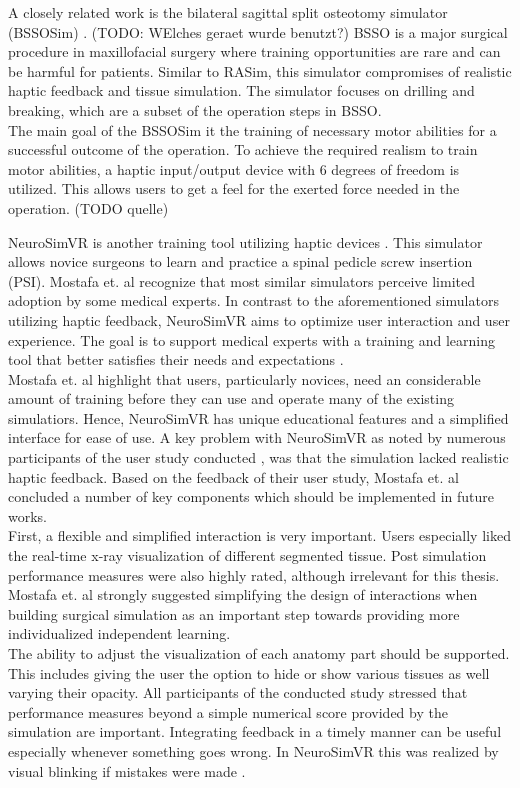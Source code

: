 A closely related work is the bilateral sagittal split osteotomy simulator (BSSOSim) \cite{RN69}.
(TODO: WElches geraet wurde benutzt?) BSSO is a major surgical procedure in maxillofacial
surgery where training opportunities are rare and can be harmful for patients. Similar
to RASim, this simulator compromises of realistic haptic feedback and tissue simulation.
The simulator focuses on drilling and breaking, which are a subset of the operation steps
in BSSO.
\\ The main goal of the BSSOSim it the training of necessary motor abilities for a successful
outcome of the operation. To achieve the required realism to train motor abilities, a haptic input/output device with 6 degrees of freedom is utilized. This allows users to
get a feel for the exerted force needed in the operation. (TODO quelle)

NeuroSimVR is another training tool utilizing haptic devices \cite{RN71}. This simulator allows
novice surgeons to learn and practice a spinal pedicle screw insertion (PSI). Mostafa
et. al recognize that most similar simulators perceive limited adoption by some medical
experts. In contrast to the aforementioned simulators utilizing haptic feedback, NeuroSimVR aims to optimize user interaction
and user experience. The goal is to support medical experts with a training and learning
tool that better satisfies their needs and expectations \cite{RN71}.
\\ Mostafa et. al highlight that users, particularly novices, need an considerable amount
of training before they can use and operate many of the existing simulatiors. Hence,
NeuroSimVR has unique educational features and a simplified interface for ease of use.
A key problem with NeuroSimVR as noted by numerous participants of the user study
conducted \cite{RN71}, was that the simulation lacked realistic haptic feedback. Based on the
feedback of their user study, Mostafa et. al concluded a number of key components which should be implemented in future works.
\\ First, a flexible and simplified interaction is very important. Users especially liked the
real-time x-ray visualization of different segmented tissue. Post simulation performance
measures were also highly rated, although irrelevant for this thesis. Mostafa et. al
strongly suggested simplifying the design of interactions when building surgical simulation as an important step towards providing more individualized independent learning.
\\ The ability to adjust the visualization of each anatomy part should be supported. This
includes giving the user the option to hide or show various tissues as well varying their
opacity. All participants of the conducted study stressed that performance measures
beyond a simple numerical score provided by the simulation are important. Integrating
feedback in a timely manner can be useful especially whenever something goes wrong.
In NeuroSimVR this was realized by visual blinking if mistakes were made \cite{RN71}.